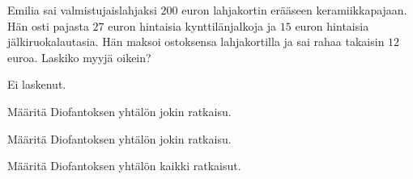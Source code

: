 \begin{tehtava}
    Emilia sai valmistujaislahjaksi $200$ euron lahjakortin erääseen keramiikkapajaan. Hän osti pajasta $27$ euron hintaisia kynttilänjalkoja ja $15$ euron hintaisia jälkiruokalautasia. Hän maksoi ostoksensa lahjakortilla ja sai rahaa takaisin $12$ euroa. Laskiko myyjä oikein?
    
    \begin{vastaus}
        Ei laskenut.
    \end{vastaus}
    
\end{tehtava}

\begin{tehtava}
    Määritä Diofantoksen yhtälön jokin ratkaisu.

    \begin{alakohdat}
    \end{alakohdat}
    
    \begin{vastaus}
        \begin{alakohdat}
        \end{alakohdat}
    \end{vastaus}
    
\end{tehtava}

\begin{tehtava}
    Määritä Diofantoksen yhtälön jokin ratkaisu.

    \begin{alakohdat}
    \end{alakohdat}
    
    \begin{vastaus}
        \begin{alakohdat}
        \end{alakohdat}
    \end{vastaus}
    
\end{tehtava}

\begin{tehtava}
    Määritä Diofantoksen yhtälön kaikki ratkaisut.
    \begin{alakohdat}
    \end{alakohdat}

    \begin{vastaus}
        \begin{alakohdat}
        \end{alakohdat}
    \end{vastaus}
    
\end{tehtava}

